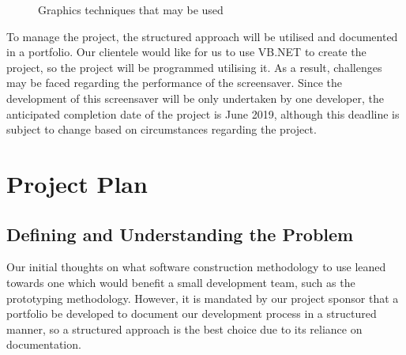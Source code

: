 \documentclass[10pt, openany]{book}
\begin{document}
\begin{figure}[H]
\caption{Graphics techniques that may be used}
\end{figure} 

To manage the project, the structured approach will be utilised and documented in a portfolio. Our clientele would like for us to use VB.NET to create the project, so the project will be programmed utilising it. As a result, challenges may be faced regarding the performance of the screensaver. Since the development of this screensaver will be only undertaken by one developer, the anticipated completion date of the project is June 2019, although this deadline is subject to change based on circumstances regarding the project.

\chapter{Project Plan}
\section{Defining and Understanding the Problem}
Our initial thoughts on what software construction methodology to use leaned towards one which would benefit a small development team, such as the prototyping methodology. However, it is mandated by our project sponsor that a portfolio be developed to document our development process in a structured manner, so a structured approach is the best choice due to its reliance on documentation.
\end{document}
